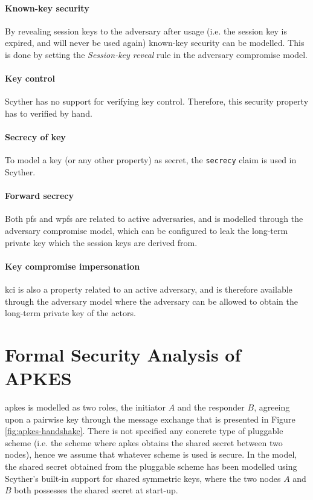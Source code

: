 \paragraph{Known-key security} By revealing session keys to the adversary after usage (i.e. the session key is expired, and will never be used again) known-key security can be modelled. This is done by setting the \emph{Session-key reveal} rule in the adversary compromise model.

\paragraph{Key control} Scyther has no support for verifying key control. Therefore, this security property has to verified by hand. 

\paragraph{Secrecy of key} To model a key (or any other property) as secret, the \texttt{secrecy} claim is used in Scyther.

\paragraph{Forward secrecy} Both \gls{pfs} and \gls{wpfs} are related to active adversaries, and is modelled through the adversary compromise model, which can be configured to leak the long-term private key which the session keys are derived from.

\paragraph{Key compromise impersonation} \gls{kci} is also a property related to an active adversary, and is therefore available through the adversary model where the adversary can be allowed to obtain the long-term private key of the actors.


\section{Formal Security Analysis of APKES}

\gls{apkes} is modelled as two roles, the initiator $A$ and the responder $B$, agreeing upon a pairwise key through the message exchange that is presented in Figure \ref{fig:apkes-handshake}. There is not specified any concrete type of pluggable scheme (i.e. the scheme where \gls{apkes} obtains the shared secret between two nodes), hence we assume that whatever scheme is used is secure. In the model, the shared secret obtained from the pluggable scheme has been modelled using Scyther's built-in support for shared symmetric keys, where the two nodes $A$ and $B$ both possesses the shared secret at start-up.

